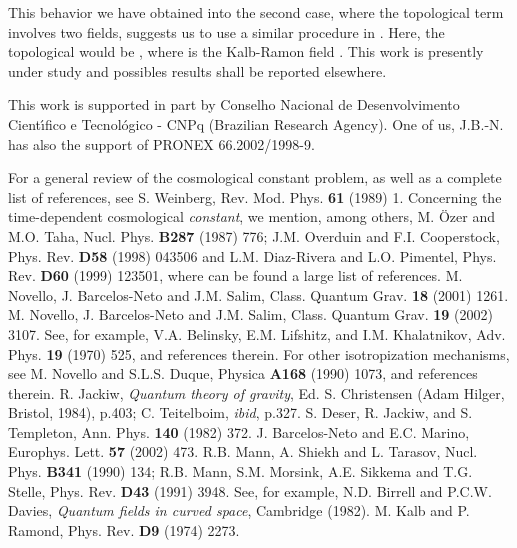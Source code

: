 \documentclass[a4paper,twocolumn,prd,groupedaddress,nofootinbib,showpacs]
{revtex4}
\begin{document}
\medskip
This behavior we have obtained into the second case, where the
topological term involves two fields, suggests us to use a similar
procedure in \coordHE{}. Here, the topological would be \coordHE{},
where \coordHE{} is the Kalb-Ramon field \cite{Kalb}. This work is
presently under study and possibles results shall be reported
elsewhere.

\bigskip
\begin{acknowledgments}
This work is supported in part by Conselho Nacional de Desenvolvimento
Cient\'{\i}fico e Tecnol\'ogico - CNPq (Brazilian Research Agency).
One of us, J.B.-N. has also the support of PRONEX 66.2002/1998-9.
\end{acknowledgments}

\begin{thebibliography}{100}
 For a general review of the cosmological constant
problem, as well as a complete list of references, see S. Weinberg,
Rev. Mod. Phys. {\bf61} (1989) 1.
 Concerning the time-dependent cosmological {\it
constant}, we mention, among others, M. \"Ozer and M.O. Taha, Nucl.
Phys. {\bf B287} (1987) 776; J.M. Overduin and F.I. Cooperstock, Phys.
Rev. {\bf D58} (1998) 043506 and L.M. Diaz-Rivera and L.O. Pimentel,
Phys. Rev. {\bf D60} (1999) 123501, where can be found a large list of
references.
 M. Novello, J. Barcelos-Neto and J.M. Salim, Class.
Quantum Grav. {\bf18} (2001) 1261.
 M. Novello, J. Barcelos-Neto and J.M. Salim, Class.
Quantum Grav. {\bf19} (2002) 3107.
 See, for example, V.A. Belinsky, E.M. Lifshitz, and
I.M. Khalatnikov, Adv. Phys. {\bf19} (1970) 525, and references
therein.
 For other isotropization mechanisms, see M. Novello
and S.L.S. Duque, Physica {\bf A168} (1990) 1073, and references
therein.
 R. Jackiw, {\it Quantum theory of gravity}, Ed. S.
Christensen (Adam Hilger, Bristol, 1984), p.403; C. Teitelboim, {\it
ibid}, p.327.
 S. Deser, R. Jackiw, and S. Templeton, Ann. Phys.
{\bf140} (1982) 372.
 J. Barcelos-Neto and E.C. Marino, Europhys. Lett.
{\bf57} (2002) 473.
 R.B. Mann, A. Shiekh and L. Tarasov, Nucl. Phys. {\bf
B341} (1990) 134; R.B. Mann, S.M. Morsink, A.E. Sikkema and T.G.
Stelle, Phys. Rev. {\bf D43} (1991) 3948.
 See, for example, N.D. Birrell and P.C.W. Davies,
{\it Quantum fields in curved space}, Cambridge (1982).
 M. Kalb and P. Ramond, Phys. Rev. {\bf D9} (1974) 2273.
\end{thebibliography}
\end{document}
